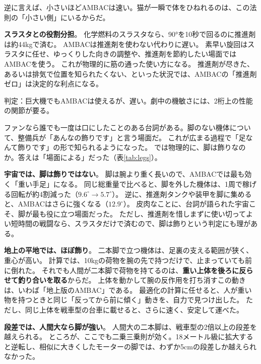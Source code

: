 \documentclass[paper=a4paper,fontsize=10pt,twocolumn,column_gap=2zw,line_length=24zw,number_of_lines=46,head_space=18mm]{jlreq}
\makeatletter
\newcounter{msec}
\renewcommand{\section}{\@ifstar{\msecstar}{\msecbox}}
\newcommand{\msecstar}[1]{\par\addvspace{0.6\baselineskip}\noindent{\bfseries\color{accent2}#1}\par\nopagebreak\vspace{0.2\baselineskip}}
\newcommand{\msecbox}[1]{\par\addvspace{0.8\baselineskip}\refstepcounter{msec}%
  \noindent\colorbox{accent2}{\parbox{\dimexpr\linewidth-2\fboxsep}{\color{white}\bfseries\large\strut\themsec\quad #1}}%
  \par\nopagebreak\vspace{0.4\baselineskip}\nopagebreak}
\makeatother
\begin{document}
逆に言えば、小さいほどAMBACは速い。猫が一瞬で体をひねれるのは、この法則の「小さい側」にいるからだ。

\textbf{スラスタとの役割分担}。
化学燃料のスラスタなら、90°を10秒で回るのに推進剤は約44kgで済む。
AMBACは推進剤を使わない代わりに遅い。
素早い旋回はスラスタに任せ、ゆっくりした向きの調整や、推進剤を節約したい場面ではAMBACを使う。
これが物理的に筋の通った使い方になる。
推進剤が尽きた、あるいは排気で位置を知られたくない、といった状況では、AMBACの「推進剤ゼロ」は決定的な利点になる。

\begin{verdict}
判定：巨大機でもAMBACは使えるが、遅い。劇中の機敏さには、2桁上の性能の関節が要る。
\end{verdict}

\section{「足なんて飾り」は本当か}

ファンなら誰でも一度は口にしたことのある台詞がある。脚のない機体について、整備兵が「あんなの飾りです」と言う場面だ\cite{gundam}。
これが広まる過程で「足なんて飾りです」の形で知られるようになった。
では物理的に、脚は飾りなのか。答えは「場面による」だった（表\ref{tab:legs}）。

\textbf{宇宙では、脚は飾りではない}。
脚は腕より重く長いので、AMBACでは最も効く「重い手足」になる。
同じ総重量で比べると、脚を外した機体は、1周で稼げる回転が約4割減った（$9.6^\circ\to5.7^\circ$）。
逆に、推進剤タンクや装甲を脚に集めると、AMBACはさらに強くなる（$12.9^\circ$）。
皮肉なことに、台詞が語られた宇宙こそ、脚が最も役に立つ場面だった。
ただし、推進剤を惜しまずに使い切ってよい短時間の戦闘なら、スラスタだけで済むので、脚は飾りという判定にも理がある。

\textbf{地上の平地では、ほぼ飾り}。
二本脚で立つ機体は、足裏の支える範囲が狭く、重心が高い。
計算では、10kgの荷物を腕の先で持つだけで、止まっていても前に倒れた。
それでも人間が二本脚で荷物を持てるのは、\textbf{重い上体を後ろに反らせて釣り合いを取る}からだ。
上体を動かして腕の反作用を打ち消すこの動きは、いわば「地上版のAMBAC」である。
最適化の計算に任せると、人が重い物を持つときと同じ「反ってから前に傾く」動きを、自力で見つけ出した。
ただし、同じ上体を戦車型の台車に載せると、さらに速く、安定して運べた。

\textbf{段差では、人間大なら脚が強い}。
人間大の二本脚は、戦車型の2倍以上の段差を越えられる。
ところが、ここでも二乗三乗則が効く。18メートル級に拡大すると逆転し、相似に大きくしたモーターの脚では、わずか5cmの段差しか越えられなかった。
\end{document}
